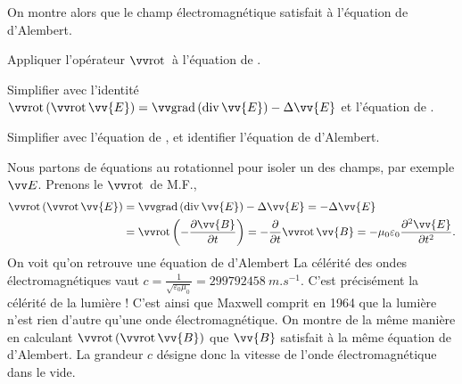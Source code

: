 \documentclass[12pt,fancy]{cours}
\begin{document}
On montre alors que le champ électromagnétique satisfait à l'équation de d'Alembert.

\begin{methode}
  \item	Appliquer l'opérateur $\rot$ à l'équation de .
  \item Simplifier avec l'identité $\rot{\left(\rot{\vv{E}}\right)}=\grad{\left(\dive{\vv{E}}\right)}-\Delta\vv{E}$ et l'équation de .
  \item Simplifier avec l'équation de , et identifier l'équation de d'Alembert.
\end{methode}

\begin{demo}

Nous partons de équations au rotationnel pour isoler un des champs, par exemple $\E$. Prenons le $\rot$ de M.F.,
\begin{equation}
\begin{split}
\rot{\left(\rot{\vv{E}}\right)}&=\grad{\left(\dive{\vv{E}}\right)}-\Delta\vv{E}=-\Delta\vv{E}\\
&=\rot{\left(-\frac{\partial \vv{B}}{\partial t}\right)}=-\frac{\partial }{\partial t}\rot{\vv{B}}=-\mu_0\varepsilon_0\frac{\partial^2\vv{E}}{\partial t^2}.
\end{split}
\end{equation}
On voit qu'on retrouve une équation de d'Alembert
La célérité des ondes électromagnétiques vaut $c=\frac{1}{\sqrt{\varepsilon_0\mu_0}} = \SI{299792458}{m.s^{-1}}$. C'est précisément la célérité de la lumière ! C'est ainsi que Maxwell comprit en 1964 que la lumière n'est rien d'autre qu'une onde électromagnétique. On montre de la même manière en calculant $\rot{\left(\rot{\vv{B}}\right)}$ que $\vv{B}$ satisfait à la même équation de d'Alembert. La grandeur $c$ désigne donc la vitesse de l'onde électromagnétique dans le vide.
\end{demo}
\end{document}
